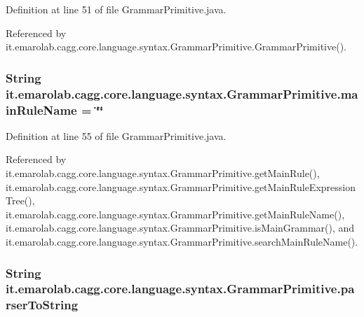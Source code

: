 Definition at line 51 of file Grammar\-Primitive.\-java.



Referenced by it.\-emarolab.\-cagg.\-core.\-language.\-syntax.\-Grammar\-Primitive.\-Grammar\-Primitive().

\hypertarget{classit_1_1emarolab_1_1cagg_1_1core_1_1language_1_1syntax_1_1GrammarPrimitive_ac2880e8b66a3f5939cafea840b34e014}{
\subsubsection[{main\-Rule\-Name}]{\setlength{\rightskip}{0pt plus 5cm}String it.\-emarolab.\-cagg.\-core.\-language.\-syntax.\-Grammar\-Primitive.\-main\-Rule\-Name = \char`\"{}\char`\"{}\hspace{0.3cm}{\ttfamily [private]}}}\label{classit_1_1emarolab_1_1cagg_1_1core_1_1language_1_1syntax_1_1GrammarPrimitive_ac2880e8b66a3f5939cafea840b34e014}


Definition at line 55 of file Grammar\-Primitive.\-java.



Referenced by it.\-emarolab.\-cagg.\-core.\-language.\-syntax.\-Grammar\-Primitive.\-get\-Main\-Rule(), it.\-emarolab.\-cagg.\-core.\-language.\-syntax.\-Grammar\-Primitive.\-get\-Main\-Rule\-Expression\-Tree(), it.\-emarolab.\-cagg.\-core.\-language.\-syntax.\-Grammar\-Primitive.\-get\-Main\-Rule\-Name(), it.\-emarolab.\-cagg.\-core.\-language.\-syntax.\-Grammar\-Primitive.\-is\-Main\-Grammar(), and it.\-emarolab.\-cagg.\-core.\-language.\-syntax.\-Grammar\-Primitive.\-search\-Main\-Rule\-Name().

\hypertarget{classit_1_1emarolab_1_1cagg_1_1core_1_1language_1_1syntax_1_1GrammarPrimitive_aefab4946b59e4707d3ee91b6a7f7d212}{
\subsubsection[{parser\-To\-String}]{\setlength{\rightskip}{0pt plus 5cm}String it.\-emarolab.\-cagg.\-core.\-language.\-syntax.\-Grammar\-Primitive.\-parser\-To\-String\hspace{0.3cm}{\ttfamily [private]}}}\label{classit_1_1emarolab_1_1cagg_1_1core_1_1language_1_1syntax_1_1GrammarPrimitive_aefab4946b59e4707d3ee91b6a7f7d212}


